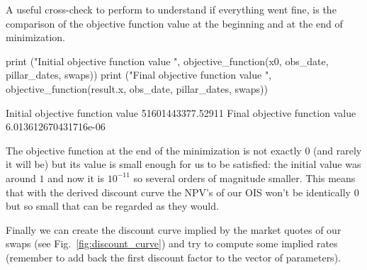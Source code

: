 A useful cross-check to perform to understand if everything went fine, is the comparison of the objective function value at the beginning and at the end of minimization.

\begin{ipython}
print ("Initial objective function value ", objective_function(x0,
                                          obs_date, 
                                          pillar_dates, 
                                          swaps))
print ("Final objective function value ", objective_function(result.x, 
                                          obs_date,
                                          pillar_dates, 
                                          swaps))
\end{ipython}
\begin{ioutput}
Initial objective function value  51601443377.52911
Final objective function value  6.013612670431716e-06
\end{ioutput}

The objective function at the end of the minimization is not exactly 0 (and rarely it will be) but its value is small enough for us to be satisfied: the initial value was around $1$ and now it is $10^{-11}$ so several orders of magnitude smaller. This means that with the derived discount curve the NPV's of our OIS won't be identically 0 but so small that can be regarded as they would.

%

Finally we can create the discount curve implied by the market quotes of our swaps (see Fig.~\ref{fig:discount_curve}) and try to compute some implied rates (remember to add back the first discount factor to the vector of parameters).

